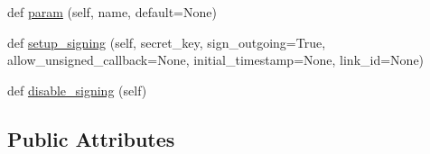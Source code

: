 \begin{DoxyCompactItemize}
\item 
def \mbox{\hyperlink{classpymavlink_1_1mavutil_1_1mavfile_af62c2fd5d5957067fd74eef6c08dcd9a}{param}} (self, name, default=None)
\item 
def \mbox{\hyperlink{classpymavlink_1_1mavutil_1_1mavfile_a0ba591be56a6a76483d5a7480512406b}{setup\+\_\+signing}} (self, secret\+\_\+key, sign\+\_\+outgoing=True, allow\+\_\+unsigned\+\_\+callback=None, initial\+\_\+timestamp=None, link\+\_\+id=None)
\item 
def \mbox{\hyperlink{classpymavlink_1_1mavutil_1_1mavfile_abd262cadb041fdae939dbfb49219f4be}{disable\+\_\+signing}} (self)
\end{DoxyCompactItemize}
\subsection*{Public Attributes}

